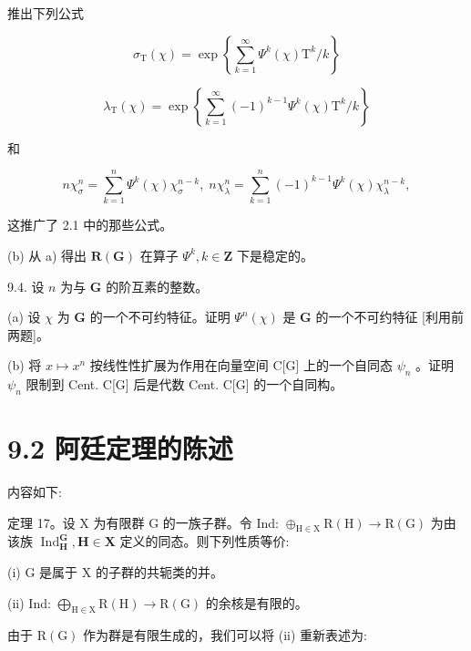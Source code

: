 \documentclass[10pt]{article}
\begin{document}
推出下列公式

\[
{\sigma }_{\mathrm{T}}\left( \chi \right)  = \exp \left\{  {\mathop{\sum }\limits_{{k = 1}}^{\infty }{\Psi }^{k}\left( \chi \right) {\mathrm{T}}^{k}/k}\right\}
\]

\[
{\lambda }_{\mathrm{T}}\left( \chi \right)  = \exp \left\{  {\mathop{\sum }\limits_{{k = 1}}^{\infty }{\left( -1\right) }^{k - 1}{\Psi }^{k}\left( \chi \right) {\mathrm{T}}^{k}/k}\right\}
\]

和

\[
n{\chi }_{\sigma }^{n} = \mathop{\sum }\limits_{{k = 1}}^{n}{\Psi }^{k}\left( \chi \right) {\chi }_{\sigma }^{n - k},\;n{\chi }_{\lambda }^{n} = \mathop{\sum }\limits_{{k = 1}}^{n}{\left( -1\right) }^{k - 1}{\Psi }^{k}\left( \chi \right) {\chi }_{\lambda }^{n - k},
\]

这推广了 2.1 中的那些公式。

(b) 从 a) 得出 \(\mathbf{R}\left( \mathbf{G}\right)\) 在算子 \({\Psi }^{k},k \in  \mathbf{Z}\) 下是稳定的。

9.4. 设 \(n\) 为与 \(\mathbf{G}\) 的阶互素的整数。

(a) 设 \(\chi\) 为 \(\mathbf{G}\) 的一个不可约特征。证明 \({\Psi }^{n}\left( \chi \right)\) 是 \(\mathbf{G}\) 的一个不可约特征 [利用前两题]。

(b) 将 \(x \mapsto  {x}^{n}\) 按线性性扩展为作用在向量空间 C[G] 上的一个自同态 \({\psi }_{n}\) 。证明 \({\psi }_{n}\) 限制到 Cent. C[G] 后是代数 Cent. C[G] 的一个自同构。

\section*{9.2 阿廷定理的陈述}

内容如下:

定理 17。设 \(\mathrm{X}\) 为有限群 G 的一族子群。令 Ind: \({ \oplus  }_{\mathrm{H} \in  \mathrm{X}}\mathrm{R}\left( \mathrm{H}\right)  \rightarrow  \mathrm{R}\left( \mathrm{G}\right)\) 为由该族 \({\operatorname{Ind}}_{\mathbf{H}}^{\mathbf{G}},\mathbf{H} \in  \mathbf{X}\) 定义的同态。则下列性质等价:

(i) \(\mathrm{G}\) 是属于 \(\mathrm{X}\) 的子群的共轭类的并。

(ii) Ind: \({\bigoplus }_{\mathrm{H} \in  \mathrm{X}}\mathrm{R}\left( \mathrm{H}\right)  \rightarrow  \mathrm{R}\left( \mathrm{G}\right)\) 的余核是有限的。

由于 \(\mathrm{R}\left( \mathrm{G}\right)\) 作为群是有限生成的，我们可以将 (ii) 重新表述为:
\end{document}
